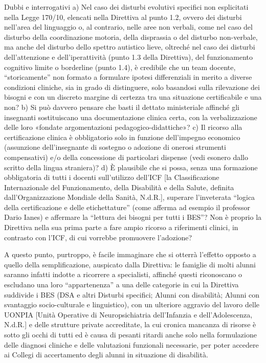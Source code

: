 Dubbi e interrogativi
a) Nel caso dei disturbi evolutivi specifici non esplicitati nella Legge 170/10, elencati nella Direttiva al punto 1.2, ovvero dei disturbi nell’area del linguaggio o, al contrario, nelle aree non verbali, come nel caso del disturbo della coordinazione motoria, della disprassia o del disturbo non-verbale, ma anche del disturbo dello spettro autistico lieve, oltreché nel caso dei disturbi dell’attenzione e dell’iperattività (punto 1.3 della Direttiva), del funzionamento cognitivo limite o borderline (punto 1.4), è credibile che un team docente, “storicamente” non formato a formulare ipotesi differenziali in merito a diverse condizioni cliniche, sia in grado di distinguere, solo basandosi sulla rilevazione dei bisogni e con un discreto margine di certezza tra una situazione certificabile e una non?
b) Si può davvero pensare che basti il dettato ministeriale affinché gli insegnanti sostituiscano una documentazione clinica certa, con la verbalizzazione delle loro «fondate argomentazioni pedagogico-didattiche»?
c) Il ricorso alla certificazione clinica è obbligatorio solo in funzione dell’impegno economico (assunzione dell’insegnante di sostegno o adozione di onerosi strumenti compensativi) e/o della concessione di particolari dispense (vedi esonero dallo scritto della lingua straniera)?
d) È plausibile che si possa, senza una formazione obbligatoria di tutti i docenti sull’utilizzo dell’ICF [la Classificazione Internazionale del Funzionamento, della Disabilità e della Salute, definita dall’Organizzazione Mondiale della Sanità, N.d.R.], superare l’inveterata “logica della certificazione e delle etichettature” (come afferma ad esempio il professor Dario Ianes) e affermare la “lettura dei bisogni per tutti i BES”? Non è proprio la Direttiva nella sua prima parte a fare ampio ricorso a riferimenti clinici, in contrasto con l’ICF, di cui vorrebbe promuovere l’adozione?

A questo punto, purtroppo, è facile immaginare che si otterrà l’effetto opposto a quello della semplificazione, auspicato dalla Direttiva: le famiglie di molti alunni saranno infatti indotte a ricorrere a specialisti, affinché questi riconoscano o escludano una loro “appartenenza” a una delle categorie in cui la Direttiva suddivide i BES (DSA e altri Disturbi specifici; Alunni con disabilità; Alunni con svantaggio socio-culturale e linguistico), con un ulteriore aggravio del lavoro delle UONPIA [Unità Operative di Neuropsichiatria dell’Infanzia e dell’Adolescenza, N.d.R.] e delle strutture private accreditate, la cui cronica mancanza di risorse è sotto gli occhi di tutti ed è causa di pesanti ritardi anche solo nella formulazione delle diagnosi cliniche e delle valutazioni funzionali necessarie, per poter accedere ai Collegi di accertamento degli alunni in situazione di disabilità.

